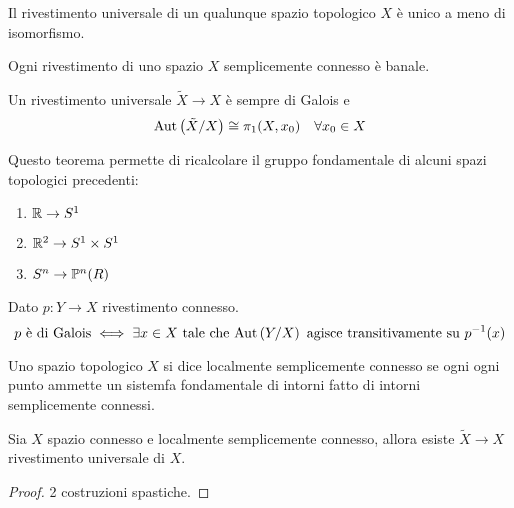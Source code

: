\documentclass[]{article}
\begin{document}
\begin{corollary}  \nl
    Il rivestimento universale di un qualunque spazio topologico $X$ \`e unico a meno di isomorfismo.
\end{corollary}

\begin{corollary} \nl
    Ogni rivestimento di uno spazio $X$ semplicemente connesso \`e banale.
\end{corollary}

\begin{theorem}  \nl
    Un rivestimento universale $\tilde{X} \to X$ \`e sempre di Galois e 
    \[
        \Aut{\tilde{X}/X} \cong \pi_1(X, x_0) \quad \forall x_0 \in X
    \]
\end{theorem}

\begin{remark}
    Questo teorema permette di ricalcolare il gruppo fondamentale di alcuni spazi topologici precedenti:
    \begin{enumerate}
        \item $\R \to \Sph{1}$ \nl
        \item $\R^2 \to \Sph{1} \times \Sph{1}$ \nl
        \item $\Sph{n} \to \Proj{R}{n}$
    \end{enumerate}
\end{remark}

\begin{lemma}  \nl
    Dato $p: Y \to X$ rivestimento connesso. \nl
    \[
        p \text{ \`e di Galois} \iff \exists x \in X \tc \Aut{Y/X} \text{ agisce transitivamente su } p^{-1}(x)
    \]
\end{lemma}

\begin{definition}  \nl
    Uno spazio topologico $X$ si dice localmente semplicemente connesso se ogni ogni punto ammette un sistemfa fondamentale
    di intorni fatto di intorni semplicemente connessi.
\end{definition}

\begin{theorem}  \nl
    Sia $X$ spazio connesso e localmente semplicemente connesso, allora esiste $\tilde{X} \to X$ rivestimento universale di $X$.
\end{theorem}

\begin{proof}
    2 costruzioni spastiche.
\end{proof}
\end{document}
